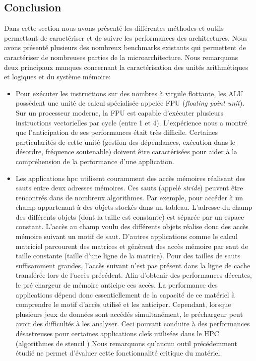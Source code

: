 \subsection{Conclusion} \label{sec:edl_hc_conclusion} \label{sec:edl_perf_conclusion}

    Dans cette section nous avons présenté les différentes méthodes et outils permettant de caractériser et de suivre les performances des architectures.  Nous avons présenté plusieurs des nombreux \glspl{benchmark} existants qui permettent de caractériser de nombreuses parties de la microarchitecture. Nous remarquons deux principaux manques concernant la caractérisation des unités arithmétiques et logiques et du système mémoire:
       \begin{itemize}
           \item Pour exécuter les instructions sur des nombres à virgule flottante, les ALU possèdent une unité de calcul spécialisée appelée FPU (\textit{floating point unit}). Sur un processeur moderne, la FPU est capable d'exécuter plusieurs instructions vectorielles par cycle (entre 1 et 4). L'expérience nous a montré que l'anticipation de ses performances était très difficile. Certaines particularités de cette unité (gestion des dépendances, exécution dans le désordre, fréquence soutenable) doivent être caractérisées pour aider à la compréhension de la performance d'une application. 
           
           \item Les applications \gls{hpc} utilisent couramment des accès mémoires réalisant des sauts entre deux adresses mémoires. Ces sauts (appelé \textit{stride}) peuvent être rencontrés dans de nombreux algorithmes. Par exemple, pour accéder à un champ appartenant à des objets stockés dans un tableau. L'adresse du champ des différents objets (dont la taille est constante) est séparée par un espace constant. L'accès au champ voulu des différents objets réalise donc des accès mémoire suivant un motif de saut. D’autres applications comme le calcul matriciel parcourent des matrices et génèrent des accès mémoire par saut de taille constante (taille d’une ligne de la matrice). Pour des tailles de sauts suffisamment grandes, l'accès suivant n'est pas présent dans la ligne de cache transférée lors de l'accès précédent. Afin d'obtenir des performances décentes, le pré chargeur de mémoire anticipe ces accès. La performance des applications dépend donc essentiellement de la capacité de ce matériel à comprendre le motif d'accès utilisé et les anticiper. Cependant, lorsque plusieurs jeux de données sont accédés simultanément, le préchargeur peut avoir des difficultés à les analyser. Ceci pouvant conduire à des performances désastreuses pour certaines applications clefs utilisées dans le HPC (algorithmes de stencil \cite{datta2008stencil}) Nous remarquons qu'aucun outil précédemment étudié ne permet d'évaluer cette fonctionnalité critique du matériel. 
       \end{itemize}
   
